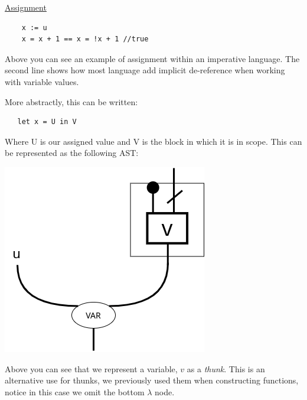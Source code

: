 \documentclass{article}
\renewcommand{\u}[1]{\underline{#1}}
\begin{document}
\u{Assignment}

\begin{verbatim}
    x := u
    x = x + 1 == x = !x + 1 //true
\end{verbatim}

Above you can see an example of assignment within an imperative language. The second line shows how most language add implicit de-reference when working with variable values.

More abstractly, this can be written: 

\begin{verbatim}
   let x = U in V 
\end{verbatim}

Where U is our assigned value and V is the block in which it is in scope.
This can be represented as the following AST:

\begin{center}
\end{center}

\begin{center}
\end{center}

\begin{center}
    \includegraphics[width=0.2\linewidth]{VarAST.png}
  \end{center}

  Above you can see that we represent a variable, $v$ as a \textit{thunk}. This is an alternative use for thunks, we previously used them when constructing functions, notice in this case we omit the bottom $\lambda$ node.
\end{document}
